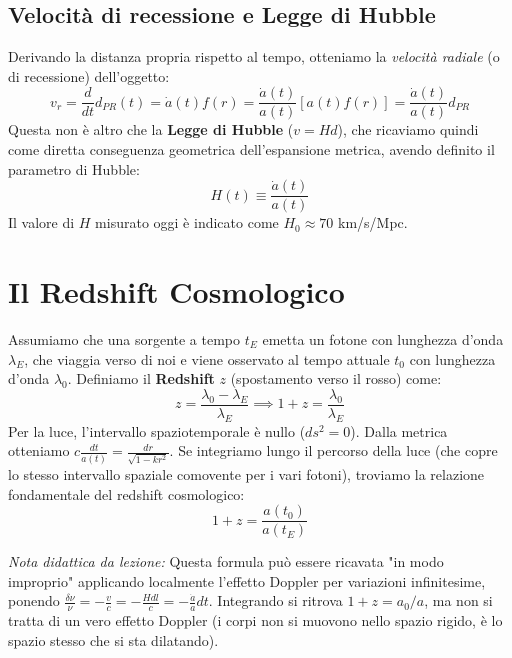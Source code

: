 \documentclass[11pt,a4paper]{report}
\begin{document}
\subsection{Velocità di recessione e Legge di Hubble}
Derivando la distanza propria rispetto al tempo, otteniamo la \textit{velocità radiale} (o di recessione) dell'oggetto:
\begin{equation}
v_r = \frac{d}{dt} d_{PR}(t) = \dot{a}(t) f(r) = \frac{\dot{a}(t)}{a(t)} \left[ a(t) f(r) \right] = \frac{\dot{a}(t)}{a(t)} d_{PR}
\end{equation}
Questa non è altro che la \textbf{Legge di Hubble} ($v = H d$), che ricaviamo quindi come diretta conseguenza geometrica dell'espansione metrica, avendo definito il parametro di Hubble:
\begin{equation}
H(t) \equiv \frac{\dot{a}(t)}{a(t)}
\end{equation}
Il valore di $H$ misurato oggi è indicato come $H_0 \approx 70$ km/s/Mpc.

\section{Il Redshift Cosmologico}
Assumiamo che una sorgente a tempo $t_E$ emetta un fotone con lunghezza d'onda $\lambda_E$, che viaggia verso di noi e viene osservato al tempo attuale $t_0$ con lunghezza d'onda $\lambda_0$.
Definiamo il \textbf{Redshift} $z$ (spostamento verso il rosso) come:
\begin{equation}
z = \frac{\lambda_0 - \lambda_E}{\lambda_E} \implies 1 + z = \frac{\lambda_0}{\lambda_E}
\end{equation}
Per la luce, l'intervallo spaziotemporale è nullo ($ds^2 = 0$). Dalla metrica otteniamo $c \frac{dt}{a(t)} = \frac{dr}{\sqrt{1-kr^2}}$. Se integriamo lungo il percorso della luce (che copre lo stesso intervallo spaziale comovente per i vari fotoni), troviamo la relazione fondamentale del redshift cosmologico:
\begin{equation}
1 + z = \frac{a(t_0)}{a(t_E)}
\end{equation}

\textit{Nota didattica da lezione:} Questa formula può essere ricavata "in modo improprio" applicando localmente l'effetto Doppler per variazioni infinitesime, ponendo $\frac{\delta\nu}{\nu} = -\frac{v}{c} = -\frac{H dl}{c} = -\frac{\dot{a}}{a}dt$. Integrando si ritrova $1+z = a_0/a$, ma non si tratta di un vero effetto Doppler (i corpi non si muovono nello spazio rigido, è lo spazio stesso che si sta dilatando).
\end{document}

